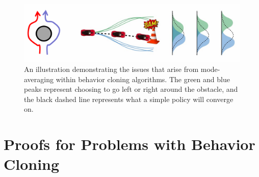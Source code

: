\begin{flushleft}
    \begin{figure}[H]
        \centering
        \includegraphics[width=0.9\linewidth]{rl/modeavg.png}
        \caption{An illustration demonstrating the issues that arise from mode-averaging within behavior cloning algorithms. The green and blue peaks represent choosing to go left or right around the obstacle, and the black dashed line represents what a simple policy will converge on.}
        \label{fig:modeavg}
    \end{figure}
\end{flushleft}

\section{Proofs for Problems with Behavior Cloning}
